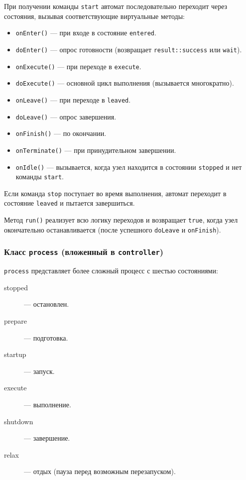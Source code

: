 \documentclass[a4paper,12pt]{article}
\begin{document}
При получении команды \texttt{start} автомат последовательно переходит через состояния, вызывая соответствующие виртуальные методы:

\begin{itemize}
    \item \texttt{onEnter()} — при входе в состояние \texttt{entered}.
    \item \texttt{doEnter()} — опрос готовности (возвращает \texttt{result::success} или \texttt{wait}).
    \item \texttt{onExecute()} — при переходе в \texttt{execute}.
    \item \texttt{doExecute()} — основной цикл выполнения (вызывается многократно).
    \item \texttt{onLeave()} — при переходе в \texttt{leaved}.
    \item \texttt{doLeave()} — опрос завершения.
    \item \texttt{onFinish()} — по окончании.
    \item \texttt{onTerminate()} — при принудительном завершении.
    \item \texttt{onIdle()} — вызывается, когда узел находится в состоянии \texttt{stopped} и нет команды \texttt{start}.
\end{itemize}

Если команда \texttt{stop} поступает во время выполнения, автомат переходит в состояние \texttt{leaved} и пытается завершиться.

Метод \texttt{run()} реализует всю логику переходов и возвращает \texttt{true}, когда узел окончательно останавливается (после успешного \texttt{doLeave} и \texttt{onFinish}).

\subsubsection{Класс \texttt{process} (вложенный в \texttt{controller})}

\texttt{process} представляет более сложный процесс с шестью состояниями:

\begin{description}
    \item[stopped] — остановлен.
    \item[prepare] — подготовка.
    \item[startup] — запуск.
    \item[execute] — выполнение.
    \item[shutdown] — завершение.
    \item[relax] — отдых (пауза перед возможным перезапуском).
\end{description}
\end{document}
